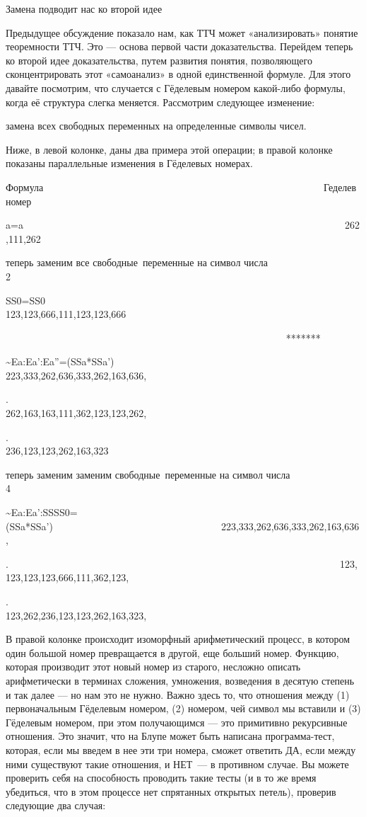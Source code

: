 \documentclass[../main.tex]{subfiles}
\begin{document}
Замена подводит нас ко второй идее

Предыдущее обсуждение показало нам, как ТТЧ может «анализировать» понятие теоремности ТТЧ\@. Это --- основа первой части доказательства. Перейдем теперь ко второй идее доказательства, путем развития понятия, позволяющего сконцентрировать этот «самоанализ» в одной единственной формуле. Для этого давайте посмотрим, что случается с Гёделевым номером какой-либо формулы, когда её структура слегка меняется. Рассмотрим следующее изменение:

замена всех свободных переменных на определенные символы чисел.

Ниже, в левой колонке, даны два примера этой операции; в правой колонке показаны параллельные изменения в Гёделевых номерах.

Формула~~~~~~~~~~~~~~~~~~~~~~~~~~~~~~~~~~~~~~~~~~~~~~~~~~~~~~~~ Геделев номер

a=a~~~~~~~~~~~~~~~~~~~~~~~~~~~~~~~~~~~~~~~~~~~~~~~~~~~~~~~~~~~~~~~~~262,111,262

теперь заменим все свободные~переменные на символ числа 2~~~~~~~~~~~~~~~~~~~~~~

SS0=SS0~~~~~~~~~~~~~~~~~~~~~~~~~~~~~~~~~~~~~~~~~~~~~~~~~~~~~~~~~ 123,123,666,111,123,123,666

~~~~~~~~~~~~~~~~~~~~~~~~~~~~~~~~~~~~~~~~~~~~~~~~~~~~~~~~ *******

\textasciitilde Ea:Ea':Ea''=(SSa*SSa')~~~~~~~~~~~~~~~~~~~~~~~~~~~~~~~~~~~~~ 223,333,262,636,333,262,163,636,

.~~~~~~~~~~~~~~~~~~~~~~~~~~~~~~~~~~~~~~~~~~~~~~~~~~~~~~~~~~~~~~~~~~~ 262,163,163,111,362,123,123,262,

.~~~~~~~~~~~~~~~~~~~~~~~~~~~~~~~~~~~~~~~~~~~~~~~~~~~~~~~~~~~~~~~~~~~ 236,123,123,262,163,323

теперь заменим заменим свободные~переменные на символ числа 4~~~~~~~~~~~~~~~~~~~~~~

\textasciitilde Ea:Ea':SSSS0=(SSa*SSa')~~~~~~~~~~~~~~~~~~~~~~~~~~~~~~~~~~223,333,262,636,333,262,163,636,

.~~~~~~~~~~~~~~~~~~~~~~~~~~~~~~~~~~~~~~~~~~~~~~~~~~~~~~~~~~~~~~~~~~~123,123,123,123,666,111,362,123,

.~~~~~~~~~~~~~~~~~~~~~~~~~~~~~~~~~~~~~~~~~~~~~~~~~~~~~~~~~~~~~~~~~~ 123,262,236,123,123,262,163,323,

В правой колонке происходит изоморфный арифметический процесс, в котором один большой номер превращается в другой, еще больший номер. Функцию, которая производит этот новый номер из старого, несложно описать арифметически в терминах сложения, умножения, возведения в десятую степень и так далее --- но нам это не нужно. Важно здесь то, что отношения между (1) первоначальным Гёделевым номером, (2) номером, чей символ мы вставили и (3) Гёделевым номером, при этом получающимся --- это примитивно рекурсивные отношения. Это значит, что на Блупе может быть написана программа-тест, которая, если мы введем в нее эти три номера, сможет ответить ДА, если между ними существуют такие отношения, и НЕТ~--- в противном случае. Вы можете проверить себя на способность проводить такие тесты (и в то же время убедиться, что в этом процессе нет спрятанных открытых петель), проверив следующие два случая:
\end{document}
